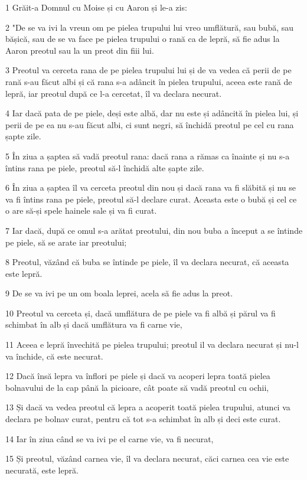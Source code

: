 \par 1 Grăit-a Domnul cu Moise și cu Aaron și le-a zis:
\par 2 "De se va ivi la vreun om pe pielea trupului lui vreo umflătură, sau bubă, sau bășică, sau de se va face pe pielea trupului o rană ca de lepră, să fie adus la Aaron preotul sau la un preot din fiii lui.
\par 3 Preotul va cerceta rana de pe pielea trupului lui și de va vedea că perii de pe rană s-au făcut albi și că rana s-a adâncit în pielea trupului, aceea este rană de lepră, iar preotul după ce l-a cercetat, îl va declara necurat.
\par 4 Iar dacă pata de pe piele, deși este albă, dar nu este și adâncită în pielea lui, și perii de pe ea nu s-au făcut albi, ci sunt negri, să închidă preotul pe cel cu rana șapte zile.
\par 5 În ziua a șaptea să vadă preotul rana: dacă rana a rămas ca înainte și nu s-a întins rana pe piele, preotul să-l închidă alte șapte zile.
\par 6 În ziua a șaptea îl va cerceta preotul din nou și dacă rana va fi slăbită și nu se va fi întins rana pe piele, preotul să-l declare curat. Aceasta este o bubă și cel ce o are să-și spele hainele sale și va fi curat.
\par 7 Iar dacă, după ce omul s-a arătat preotului, din nou buba a început a se întinde pe piele, să se arate iar preotului;
\par 8 Preotul, văzând că buba se întinde pe piele, îl va declara necurat, că aceasta este lepră.
\par 9 De se va ivi pe un om boala leprei, acela să fie adus la preot.
\par 10 Preotul va cerceta și, dacă umflătura de pe piele va fi albă și părul va fi schimbat în alb și dacă umflătura va fi carne vie,
\par 11 Aceea e lepră învechită pe pielea trupului; preotul il va declara necurat și nu-l va închide, că este necurat.
\par 12 Dacă însă lepra va înflori pe piele și dacă va acoperi lepra toată pielea bolnavului de la cap până la picioare, cât poate să vadă preotul cu ochii,
\par 13 Și dacă va vedea preotul că lepra a acoperit toată pielea trupului, atunci va declara pe bolnav curat, pentru că tot s-a schimbat în alb și deci este curat.
\par 14 Iar în ziua când se va ivi pe el carne vie, va fi necurat,
\par 15 Și preotul, văzând carnea vie, îl va declara necurat, căci carnea cea vie este necurată, este lepră.
